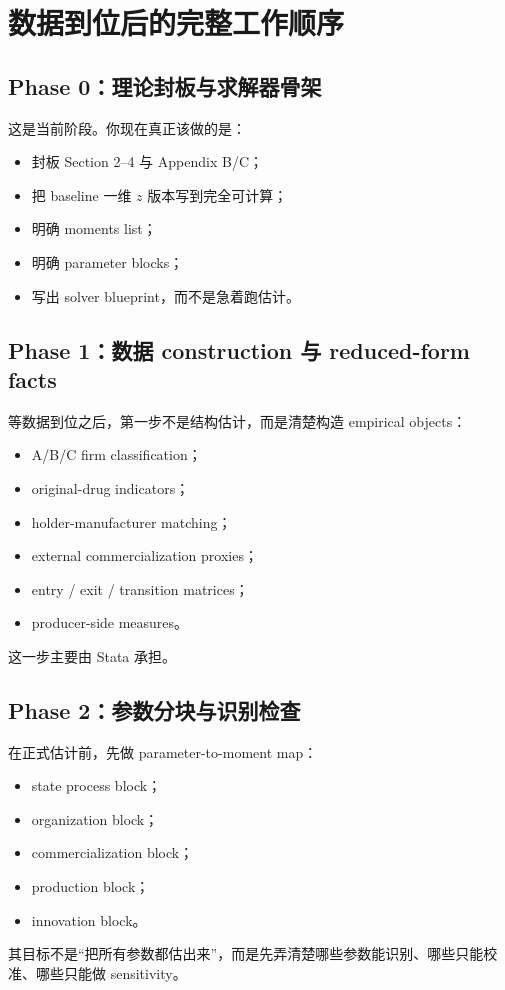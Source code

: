 \documentclass[12pt]{ctexart}
\begin{document}
\section{数据到位后的完整工作顺序}

\subsection{Phase 0：理论封板与求解器骨架}
这是当前阶段。你现在真正该做的是：
\begin{itemize}[leftmargin=2em]
    \item 封板 Section 2--4 与 Appendix B/C；
    \item 把 baseline 一维 $z$ 版本写到完全可计算；
    \item 明确 moments list；
    \item 明确 parameter blocks；
    \item 写出 solver blueprint，而不是急着跑估计。
\end{itemize}

\subsection{Phase 1：数据 construction 与 reduced-form facts}
等数据到位之后，第一步不是结构估计，而是清楚构造 empirical objects：
\begin{itemize}[leftmargin=2em]
    \item A/B/C firm classification；
    \item original-drug indicators；
    \item holder-manufacturer matching；
    \item external commercialization proxies；
    \item entry / exit / transition matrices；
    \item producer-side measures。
\end{itemize}
这一步主要由 Stata 承担。

\subsection{Phase 2：参数分块与识别检查}
在正式估计前，先做 parameter-to-moment map：
\begin{itemize}[leftmargin=2em]
    \item state process block；
    \item organization block；
    \item commercialization block；
    \item production block；
    \item innovation block。
\end{itemize}
其目标不是“把所有参数都估出来”，而是先弄清楚哪些参数能识别、哪些只能校准、哪些只能做 sensitivity。
\end{document}
